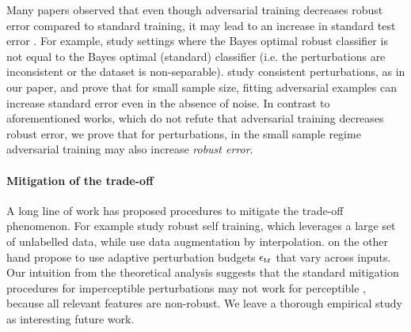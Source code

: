 Many papers observed that even though adversarial training decreases robust error compared to standard training, it may lead
to an increase in standard test error \cite{madry18, zhang19}.  
For example, \citet{tsipras19, zhang19, javanmard20, dobriban20, chen20} study settings where the Bayes optimal robust classifier is not equal to the Bayes optimal (standard)
classifier (i.e. the perturbations are inconsistent or the dataset is non-separable).
\cite{raghunathan20} study consistent perturbations, as in our paper,
and prove that for small sample size, fitting adversarial
examples can increase standard error even in the absence of
noise. In contrast to aforementioned works, which do not refute that
adversarial training decreases robust error, we prove that for
\nameofattacks perturbations, in the small sample regime adversarial training may also increase \emph{robust error}.

\paragraph{Mitigation of the trade-off} 
A long line of work has proposed procedures to 
mitigate the trade-off phenomenon.  For example \citet{alayrac19,
  Carmon19, zhai20, raghunathan20} study robust self training, which
leverages a large set of unlabelled data, while \citet{lee20, lamb19,
  xu20} use data augmentation by interpolation. \citet{Ding20,
  balaji19, Cheng20} on the other hand propose to use adaptive
perturbation budgets $\epsilon_{\text{tr}}$ that vary across inputs. 
Our intuition from the theoretical analysis suggests that the standard
mitigation procedures for imperceptible perturbations may not work for
perceptible \nameofattacks, because all relevant features are non-robust.
We leave a thorough empirical study
as interesting future work.


